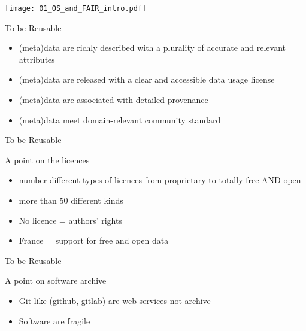 \begin{frame}
\texttt{[image: 01\_OS\_and\_FAIR\_intro.pdf]}
\end{frame}

\begin{frame}
\begin{block}{To be Reusable}
\begin{itemize}
\item (meta)data are richly described with a plurality of accurate and relevant attributes
\item (meta)data are released with a clear and accessible data usage license
\item (meta)data are associated with detailed provenance
\item (meta)data meet domain-relevant community standard
\end{itemize}
\end{block}
\end{frame}


\begin{frame}{To be Reusable}
\begin{block}{A point on the licences}
\begin{itemize}
\item number different types of licences from proprietary to totally free AND open
\item more than 50 different kinds
\item No licence = authors' rights
\item France = support for free and open data
\end{itemize}
\end{block}
\end{frame}

\begin{frame}{To be Reusable}
\begin{block}{A point on software archive}
\begin{itemize}
\item Git-like (github, gitlab) are web services not archive
\item Software are fragile
\end{itemize}
\end{block}
\end{frame}



